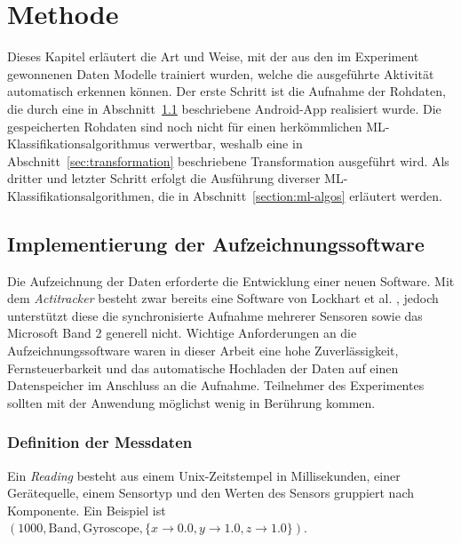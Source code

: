 \chapter{Methode}
\label{chap:method}
Dieses Kapitel erläutert die Art und Weise, mit der aus den im Experiment gewonnenen Daten Modelle trainiert wurden, welche die ausgeführte Aktivität automatisch erkennen können. Der erste Schritt ist die Aufnahme der Rohdaten, die durch eine in Abschnitt~\ref{sec:android-app} beschriebene Android-App realisiert wurde. Die gespeicherten Rohdaten sind noch nicht für einen herkömmlichen ML-Klassifikationsalgorithmus verwertbar, weshalb eine in Abschnitt~\ref{sec:transformation} beschriebene Transformation ausgeführt wird. Als dritter und letzter Schritt erfolgt die Ausführung diverser ML-Klassifikationsalgorithmen, die in Abschnitt~\ref{section:ml-algos} erläutert werden.

\section{Implementierung der Aufzeichnungssoftware}
\label{sec:android-app}
Die Aufzeichnung der Daten erforderte die Entwicklung einer neuen Software. Mit dem \textit{Actitracker} besteht zwar bereits eine Software von Lockhart et al. \cite{Lockhart2014}, jedoch unterstützt diese die synchronisierte Aufnahme mehrerer Sensoren sowie das Microsoft Band 2 generell nicht. Wichtige Anforderungen an die Aufzeichnungssoftware waren in dieser Arbeit eine hohe Zuverlässigkeit, Fernsteuerbarkeit und das automatische Hochladen der Daten auf einen Datenspeicher im Anschluss an die Aufnahme. Teilnehmer des Experimentes sollten mit der Anwendung möglichst wenig in Berührung kommen.

\subsection{Definition der Messdaten}
\begin{definition}
Ein \textit{Reading} besteht aus einem Unix-Zeitstempel in Millisekunden, einer Gerätequelle, einem Sensortyp und den Werten des Sensors gruppiert nach Komponente. Ein Beispiel ist $(1000, \text{Band}, \text{Gyroscope}, \{x \to 0.0, y \to 1.0, z \to 1.0\})$.
\end{definition}
